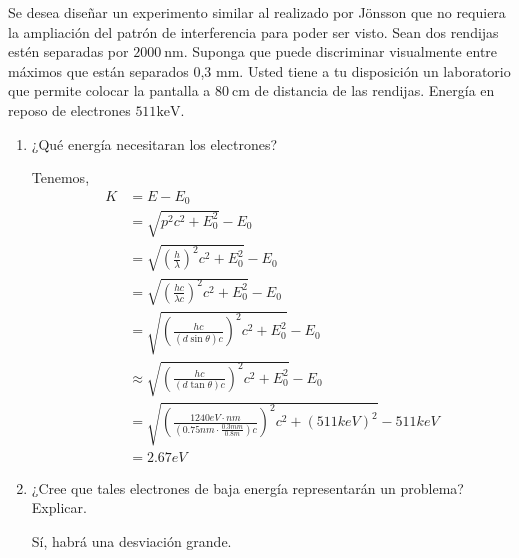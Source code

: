 \begin{problema}
    Se desea diseñar un experimento similar al realizado por Jönsson que no requiera la ampliación del patrón de interferencia para poder ser visto. Sean dos rendijas estén separadas por $2000 \mathrm{~nm}$. Suponga que puede discriminar visualmente entre máximos que están separados 0,3 $\mathrm{mm}$. Usted tiene a tu disposición un laboratorio que permite colocar la pantalla a $80 \mathrm{~cm}$ de distancia de las rendijas.  Energía en reposo de electrones $511 \mathrm{keV}$.
    \begin{enumerate}
        \item ¿Qué energía necesitaran los electrones? 
        \begin{sol}
            Tenemos,
            \begin{align*}
                K &= E-E_0\\
                  &= \sqrt{p^2c^2+E_0^2}-E_0\\
                  &= \sqrt{\left(\frac{h}{\lambda}\right)^2c^2+E_0^2}-E_0\\
                  &= \sqrt{\left(\frac{hc}{\lambda c}\right)^2c^2+E_0^2}-E_0\\
                  &= \sqrt{\left(\frac{hc}{\left(d\sin \theta\right) c}\right)^2c^2+E_0^2}-E_0\\
                  &\approx \sqrt{\left(\frac{hc}{\left(d\tan \theta\right) c}\right)^2c^2+E_0^2}-E_0\\
                  &= \sqrt{\left(\frac{1240 eV\cdot nm}{\left(0.75nm\cdot \frac{0.3mm}{0.8m}\right) c}\right)^2c^2+(511keV)^2}-511keV\\
                  &= 2.67eV
            \end{align*}
        \end{sol}
        \item ¿Cree que tales electrones de baja energía representarán un problema? Explicar.
        \begin{sol}
            Sí, habrá una desviación grande. 
        \end{sol}
    \end{enumerate}
\end{problema}

